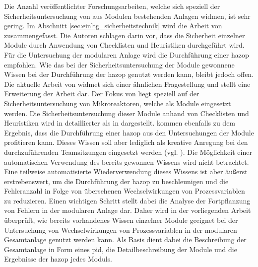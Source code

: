Die Anzahl ver\"offentlichter Forschungsarbeiten, welche sich speziell der Sicherheitsuntersuchung von aus Modulen bestehenden Anlagen widmen, ist sehr gering. Im Abschnitt \ref{sec:einltg_sicherheitstechnik} wird die Arbeit von \citeauthor{Fleischer_2015} \cite{Fleischer_2015} zusammengefasst. Die Autoren schlagen darin vor, dass die Sicherheit einzelner Module durch Anwendung von Checklisten und Heuristiken durchgef\"uhrt wird. F\"ur die Untersuchung der modularen Anlage wird die Durchf\"uhrung einer \ac{hazop} empfohlen. Wie das bei der Sicherheitsuntersuchung der Module gewonnene Wissen bei der Durchf\"uhrung der \ac{hazop} genutzt werden kann, bleibt jedoch offen. \newline
Die aktuelle Arbeit  von \citeauthor{Kockmann_2017} \cite{Kockmann_2017} widmet sich einer \"ahnlichen Fragestellung und stellt eine Erweiterung der Arbeit  \cite{Fleischer_2015} dar. Der Fokus von \citeauthor{Kockmann_2017} liegt  speziell auf der Sicherheitsuntersuchung von Mikroreaktoren, welche als Module eingesetzt werden. Die Sicherheitsuntersuchung dieser Module anhand von Checklisten und Heuristiken wird in \cite{Kockmann_2017} detaillierter als in \cite{Fleischer_2015} dargestellt. \citeauthor{Kockmann_2017} kommen ebenfalls zu dem Ergebnis, dass die Durchf\"uhrung einer \ac{hazop} aus den Untersuchungen der Module profitieren kann. Dieses Wissen soll aber lediglich als kreative Anregung bei den durchzuf\"uhrenden Teamsitzungen eingesetzt werden {(vgl. \cite[S. 20]{Kockmann_2017})}. Die M\"oglichkeit einer automatischen Verwendung des bereits gewonnen Wissens wird nicht betrachtet. \newline
Eine teilweise automatisierte Wiederverwendung dieses Wissens ist aber \"au\ss{}erst erstrebenswert, um die Durchf\"uhrung der \ac{hazop} zu beschleunigen und die Fehleranzahl in Folge von \"ubersehenen Wechselwirkungen von Prozessvariablen zu reduzieren. Einen wichtigen Schritt stellt dabei die Analyse der Fortpflanzung von Fehlern in der modularen Anlage dar. Daher wird in der vorliegenden Arbeit \"uberpr\"uft, wie bereits vorhandenes Wissen einzelner Module geeignet bei der Untersuchung von Wechselwirkungen von Prozessvariablen in der modularen Gesamtanlage genutzt werden kann. Als Basis dient dabei die Beschreibung der Gesamtanlage in Form eines \ac{pid}, die Detailbeschreibung der Module und die Ergebnisse der \ac{hazop} jedes Moduls.